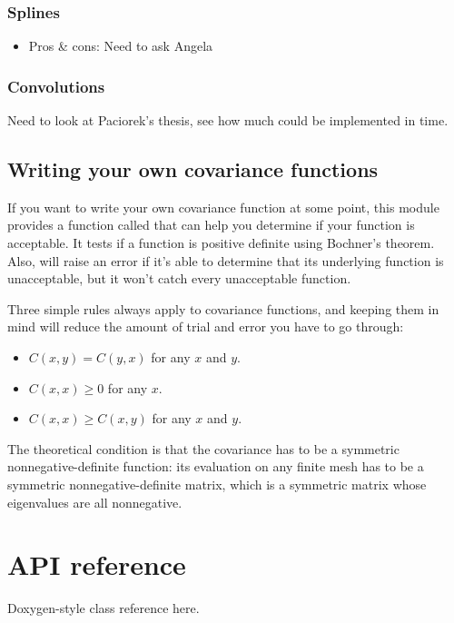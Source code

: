 \documentclass{manual}
\begin{document}
\subsection{Splines}\label{sub:splines}
\begin{itemize}
	\item Pros \& cons: Need to ask Angela
\end{itemize}

\subsection{Convolutions}\label{sub:convolutions}
Need to look at Paciorek's thesis, see how much could be implemented in time.


\section{Writing your own covariance functions}\label{sec:usercov} %
If you want to write your own covariance function at some point, this module provides a function called  that can help you determine if your function is acceptable. It tests if a function is positive definite using Bochner's theorem. Also,  will raise an error if it's able to determine that its underlying function is unacceptable, but it won't catch every unacceptable function. 

Three simple rules always apply to covariance functions, and keeping them in mind will reduce the amount of trial and error you have to go through:
\begin{itemize}
	\item $C(x,y)=C(y,x)$ for any $x$ and $y$.
	\item $C(x,x) \ge 0$ for any $x$.
	\item $C(x,x)\ge C(x,y)$ for any $x$ and $y$.
\end{itemize}

The theoretical condition is that the covariance has to be a symmetric nonnegative-definite function: its evaluation on any finite mesh has to be a symmetric nonnegative-definite matrix, which is a symmetric matrix whose eigenvalues are all nonnegative.



\chapter{API reference}\label{cha:reference} 

Doxygen-style class reference here.
\end{document}
